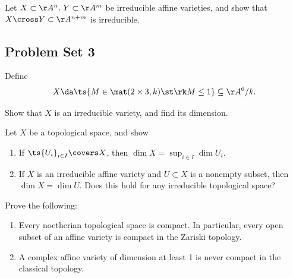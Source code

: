 \begin{exercise}[Gathmann 2.24]

Let \(X \subset \AA^n,\, Y\subset \AA^m\) be irreducible affine
varieties, and show that \(X\cross Y\subset \AA^{n+m}\) is irreducible.

\end{exercise}

\hypertarget{problem-set-3}{%
\subsection{Problem Set 3}\label{problem-set-3}}

\begin{exercise}[Gathmann 2.33]

Define
\begin{align*}  
X \da \ts{M \in \mat(2\times 3, k) \st \rk M \leq 1} \subseteq \AA^6/k
.\end{align*}

Show that \(X\) is an irreducible variety, and find its dimension.

\end{exercise}

\begin{exercise}[Gathmann 2.34]

Let \(X\) be a topological space, and show

\begin{enumerate}
\def\labelenumi{\alph{enumi}.}
\item
  If \(\ts{U_i}_{i\in I} \covers X\), then
  \(\dim X = \sup_{i\in I} \dim U_i\).
\item
  If \(X\) is an irreducible affine variety and \(U\subset X\) is a
  nonempty subset, then \(\dim X = \dim U\). Does this hold for any
  irreducible topological space?
\end{enumerate}

\end{exercise}

\begin{exercise}[Gathmann 2.36]

Prove the following:

\begin{enumerate}
\def\labelenumi{\alph{enumi}.}
\item
  Every noetherian topological space is compact. In particular, every
  open subset of an affine variety is compact in the Zariski topology.
\item
  A complex affine variety of dimension at least 1 is never compact in
  the classical topology.
\end{enumerate}

\end{exercise}

